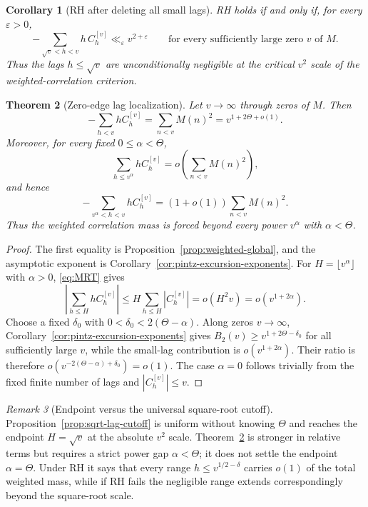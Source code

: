 \documentclass[11pt]{amsart}
\numberwithin{equation}{section}
\theoremstyle{plain}
\newtheorem{theorem}{Theorem}[section]
\newtheorem{corollary}[theorem]{Corollary}
\theoremstyle{definition}
\theoremstyle{remark}
\newtheorem{remark}[theorem]{Remark}
\newcommand{\eps}{\varepsilon}
\begin{document}
\begin{corollary}[RH after deleting all small lags]
\label{cor:RH-large-lags}
RH holds if and only if, for every $\eps>0$,
\[
-\sum_{\sqrt v<h<v}h\,C_h^{[v]}\ll_\eps v^{2+\eps}
\qquad\text{for every sufficiently large zero $v$ of $M$.}
\]
Thus the lags $h\le\sqrt v$ are unconditionally negligible at the critical
$v^2$ scale of the weighted-correlation criterion.
\end{corollary}

\begin{theorem}[Zero-edge lag localization]
\label{thm:theta-lag-localization}
Let $v\to\infty$ through zeros of $M$.  Then
\begin{equation}
\label{eq:weighted-corr-exponent}
 -\sum_{h<v}hC_h^{[v]}
 =\sum_{n<v}M(n)^2
 =v^{1+2\Theta+o(1)}.
\end{equation}
Moreover, for every fixed $0\le\alpha<\Theta$,
\begin{equation}
\label{eq:theta-small-lags-negligible}
 \sum_{h\le v^\alpha}hC_h^{[v]}
 =o\!\left(\sum_{n<v}M(n)^2\right),
\end{equation}
and hence
\begin{equation}
\label{eq:theta-large-lag-mass}
 -\sum_{v^\alpha<h<v}hC_h^{[v]}
 =(1+o(1))\sum_{n<v}M(n)^2.
\end{equation}
Thus the weighted correlation mass is forced beyond every power
$v^\alpha$ with $\alpha<\Theta$.
\end{theorem}

\begin{proof}
The first equality is Proposition~\ref{prop:weighted-global}, and the
asymptotic exponent is Corollary~\ref{cor:pintz-excursion-exponents}.
For $H=\lfloor v^\alpha\rfloor$ with $\alpha>0$, \eqref{eq:MRT} gives
\[
 \left|\sum_{h\le H}hC_h^{[v]}\right|
 \le H\sum_{h\le H}|C_h^{[v]}|
 =o(H^2v)=o(v^{1+2\alpha}).
\]
Choose a fixed $\delta_0$ with
$0<\delta_0<2(\Theta-\alpha)$.  Along zeros $v\to\infty$,
Corollary~\ref{cor:pintz-excursion-exponents} gives
$B_2(v)\ge v^{1+2\Theta-\delta_0}$ for all sufficiently large $v$, while
the small-lag contribution is $o(v^{1+2\alpha})$.  Their ratio is therefore
$o(v^{-2(\Theta-\alpha)+\delta_0})=o(1)$.  The case
$\alpha=0$ follows trivially from the fixed finite number of lags and
$|C_h^{[v]}|\le v$.
\end{proof}

\begin{remark}[Endpoint versus the universal square-root cutoff]
\label{rem:theta-vs-sqrt-cutoff}
Proposition~\ref{prop:sqrt-lag-cutoff} is uniform without knowing $\Theta$
and reaches the endpoint $H=\sqrt v$ at the absolute $v^2$ scale.
Theorem~\ref{thm:theta-lag-localization} is stronger in relative terms but
requires a strict power gap $\alpha<\Theta$; it does not settle the endpoint
$\alpha=\Theta$.  Under RH it says that every range
$h\le v^{1/2-\delta}$ carries $o(1)$ of the total weighted mass, while if RH
fails the negligible range extends correspondingly beyond the square-root
scale.
\end{remark}
\end{document}
